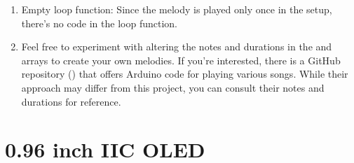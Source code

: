 \documentclass[a4paper,11pt,english]{sphinxmanual}
\begin{document}
\begin{enumerate}
\begin{sphinxVerbatim}[commandchars=\\\{\}]
\PYG{p}{[}\PYG{p}{]}
\PYG{p}{[}\PYG{p}{]}
\end{sphinxVerbatim}

\item {} 
\sphinxAtStartPar
Empty loop function:
Since the melody is played only once in the setup, there’s no code in the loop function.

\item {} 
\sphinxAtStartPar
Feel free to experiment with altering the notes and durations in the  and  arrays to create your own melodies. If you’re interested, there is a GitHub repository () that offers Arduino code for playing various songs. While their approach may differ from this project, you can consult their notes and durations for reference.

\end{enumerate}

\sphinxstepscope


\section{0.96 inch IIC OLED}
\label{\detokenize{Basic_Project/0.96_inch_OLED:inch-iic-oled}}\label{\detokenize{Basic_Project/0.96_inch_OLED:basic-0-96-inch-oled}}\label{\detokenize{Basic_Project/0.96_inch_OLED::doc}}
\end{document}
